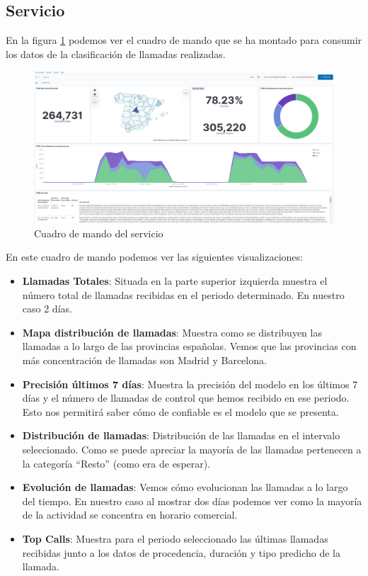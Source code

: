 \subsection{Servicio}

En la figura \ref{fig:cmserv} podemos ver el cuadro de mando que se ha montado para consumir los datos de la clasificación de llamadas realizadas.  

\begin{figure}[!ht]
	\centering
	\includegraphics[width=1\textwidth]{images/serv/CM-calls}
	\caption{Cuadro de mando del servicio}
	\label{fig:cmserv}
\end{figure}


En este cuadro de mando podemos ver las siguientes visualizaciones: 

\begin{itemize}
\item \textbf{Llamadas Totales}: Situada en la parte superior izquierda muestra el número total de llamadas recibidas en el periodo determinado. En nuestro caso 2 días. 
\item \textbf{Mapa distribución de llamadas}: Muestra como se distribuyen las llamadas a lo largo de las provincias españolas. Vemos que las provincias con más concentración de llamadas son Madrid y Barcelona.

\item \textbf{Precisión últimos 7 días}: Muestra la precisión del modelo en los últimos 7 días y el número de llamadas de control que hemos recibido en ese periodo. Esto nos permitirá saber cómo de confiable es el modelo que se presenta.

\item \textbf{Distribución de llamadas}: Distribución de las llamadas en el intervalo seleccionado. Como se puede apreciar la mayoría de las llamadas pertenecen a la categoría ``Resto'' (como era de esperar). 

\item \textbf{Evolución de llamadas}: Vemos cómo evolucionan las llamadas a lo largo del tiempo. En nuestro caso al mostrar dos días podemos ver como la mayoría de la actividad se concentra en horario comercial.

\item \textbf{Top Calls}: Muestra para el periodo seleccionado las últimas llamadas recibidas junto a los datos de procedencia, duración y tipo predicho de la llamada.

\end{itemize}

